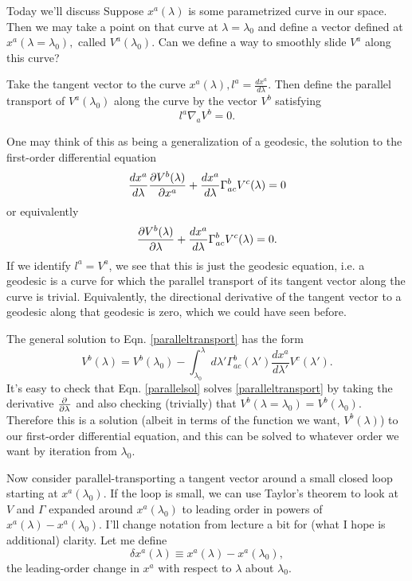 Today we'll discuss  Suppose $x^a(\lambda)$ is some parametrized curve in our space. Then we may take a point on that curve at $\lambda=\lambda_0$ and define a vector defined at $x^a(\lambda=\lambda_0),$ called $V^a(\lambda_0)$. Can we define a way to smoothly slide $V^a$ along this curve?

Take the tangent vector to the curve $x^a(\lambda), l^a=\frac{dx^a}{d\lambda}.$ Then define the parallel transport of $V^a(\lambda_0)$ along the curve by the vector $V^b$ satisfying
$$l^a \nabla_a V^b=0.$$

One may think of this as being a generalization of a geodesic, the solution to the first-order differential equation
\begin{equation*}
\frac{dx^a}{d\lambda}\frac{\p V^b(\lambda)}{\p x^a}+\frac{dx^a}{d\lambda}\Gamma^b_{ac}V^c(\lambda)=0
\end{equation*}
or equivalently
\begin{equation}\label{paralleltransport}
\frac{\p V^b(\lambda)}{\p \lambda}+\frac{dx^a}{d\lambda}\Gamma^b_{ac}V^c(\lambda)=0.
\end{equation}
If we identify $l^a=V^a$, we see that this is just the geodesic equation, i.e. a geodesic is a curve for which the parallel transport of its tangent vector along the curve is trivial. Equivalently, the directional derivative of the tangent vector to a geodesic along that geodesic is zero, which we could have seen before.

The general solution to Eqn. \ref{paralleltransport} has the form
\begin{equation}\label{parallelsol}
V^b(\lambda)=V^b(\lambda_0)-\int_{\lambda_0}^\lambda d\lambda' \Gamma^b_{ac}(\lambda') \frac{dx^a}{d\lambda'}V^c(\lambda').
\end{equation}
It's easy to check that Eqn. \ref{parallelsol} solves \ref{paralleltransport} by taking the derivative $\P{}{\lambda}$ and also checking (trivially) that $V^b(\lambda=\lambda_0)=V^b(\lambda_0)$. Therefore this is a solution (albeit in terms of the function we want, $V^b(\lambda)$) to our first-order differential equation, and this can be solved to whatever order we want by iteration from $\lambda_0.$

Now consider parallel-transporting a tangent vector around a small closed loop starting at $x^a(\lambda_0)$. If the loop is small, we can use Taylor's theorem to look at $V$ and $\Gamma$ expanded around $x^a(\lambda_0)$ to leading order in powers of $x^a(\lambda)-x^a(\lambda_0)$. I'll change notation from lecture a bit for (what I hope is additional) clarity. Let me define
$$\delta x^a(\lambda) \equiv x^a(\lambda)-x^a(\lambda_0),$$
the leading-order change in $x^a$ with respect to $\lambda$ about $\lambda_0.$

